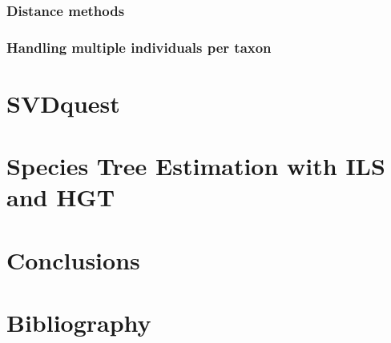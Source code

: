 \documentclass[edeposit,fullpage]{uiucthesis2014}
\theoremstyle{definition}
\begin{document}
\subsection{Distance methods}
\subsection{Handling multiple individuals per taxon}


\chapter{SVDquest}


\chapter{Species Tree Estimation with ILS and HGT}
%


\chapter{Conclusions}

\chapter{Bibliography}
\printbibliography

\appendix*


\backmatter
\end{document}
